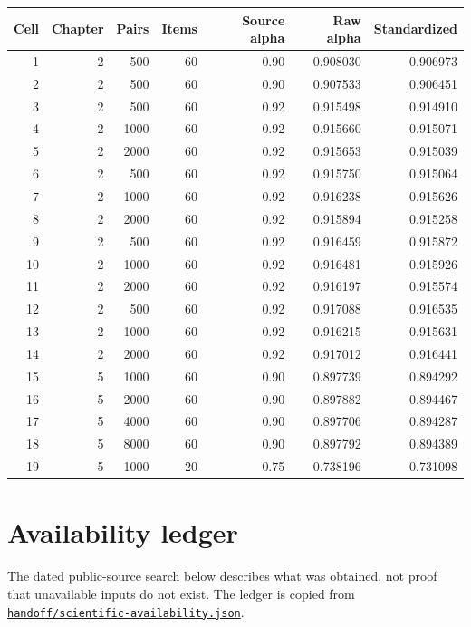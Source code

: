 \documentclass[11pt]{article}
\begin{document}
\begin{longtable}{rrrrrrr}
\toprule Cell & Chapter & Pairs & Items & Source alpha & Raw alpha & Standardized\\\midrule\endhead
1 & 2 & 500 & 60 & 0.90 & 0.908030 & 0.906973\\
2 & 2 & 500 & 60 & 0.90 & 0.907533 & 0.906451\\
3 & 2 & 500 & 60 & 0.92 & 0.915498 & 0.914910\\
4 & 2 & 1000 & 60 & 0.92 & 0.915660 & 0.915071\\
5 & 2 & 2000 & 60 & 0.92 & 0.915653 & 0.915039\\
6 & 2 & 500 & 60 & 0.92 & 0.915750 & 0.915064\\
7 & 2 & 1000 & 60 & 0.92 & 0.916238 & 0.915626\\
8 & 2 & 2000 & 60 & 0.92 & 0.915894 & 0.915258\\
9 & 2 & 500 & 60 & 0.92 & 0.916459 & 0.915872\\
10 & 2 & 1000 & 60 & 0.92 & 0.916481 & 0.915926\\
11 & 2 & 2000 & 60 & 0.92 & 0.916197 & 0.915574\\
12 & 2 & 500 & 60 & 0.92 & 0.917088 & 0.916535\\
13 & 2 & 1000 & 60 & 0.92 & 0.916215 & 0.915631\\
14 & 2 & 2000 & 60 & 0.92 & 0.917012 & 0.916441\\
15 & 5 & 1000 & 60 & 0.90 & 0.897739 & 0.894292\\
16 & 5 & 2000 & 60 & 0.90 & 0.897882 & 0.894467\\
17 & 5 & 4000 & 60 & 0.90 & 0.897706 & 0.894287\\
18 & 5 & 8000 & 60 & 0.90 & 0.897792 & 0.894389\\
19 & 5 & 1000 & 20 & 0.75 & 0.738196 & 0.731098\\
\bottomrule\end{longtable}\section{Availability ledger}
The dated public-source search below describes what was obtained, not proof that unavailable inputs do not exist. The ledger is copied from \href{https://github.com/alectionary/vibe-math/blob/master/formalization/schwabe-psychometric-genetics/handoff/scientific-availability.json}{\nolinkurl{handoff/scientific-availability.json}}.
\end{document}

